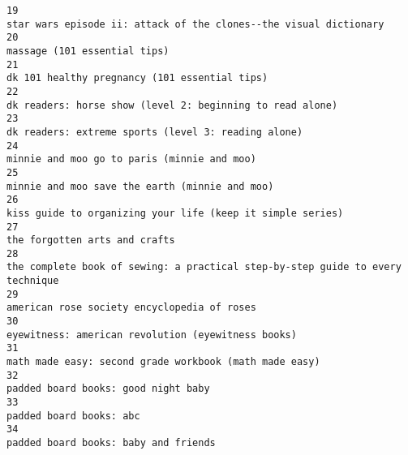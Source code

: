 \documentclass[
]{report}
\begin{document}
\begin{verbatim}
19                                                                                                      star wars episode ii: attack of the clones--the visual dictionary
20                                                                                                                                           massage (101 essential tips)
21                                                                                                                          dk 101 healthy pregnancy (101 essential tips)
22                                                                                                              dk readers: horse show (level 2: beginning to read alone)
23                                                                                                                    dk readers: extreme sports (level 3: reading alone)
24                                                                                                                            minnie and moo go to paris (minnie and moo)
25                                                                                                                         minnie and moo save the earth (minnie and moo)
26                                                                                                             kiss guide to organizing your life (keep it simple series)
27                                                                                                                                          the forgotten arts and crafts
28                                                                                         the complete book of sewing: a practical step-by-step guide to every technique
29                                                                                                                            american rose society encyclopedia of roses
30                                                                                                                     eyewitness: american revolution (eyewitness books)
31                                                                                                                 math made easy: second grade workbook (math made easy)
32                                                                                                                                    padded board books: good night baby
33                                                                                                                                                padded board books: abc
34                                                                                                                                   padded board books: baby and friends

\end{verbatim}
\end{document}
